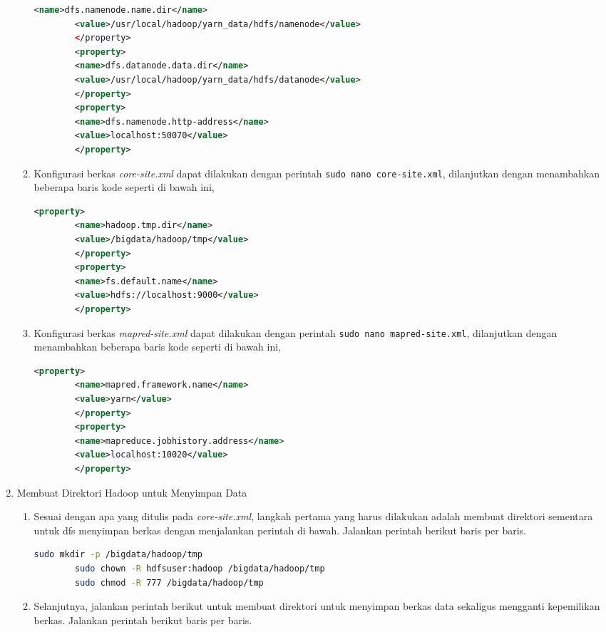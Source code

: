 \begin{enumerate}
\begin{enumerate}
\begin{lstlisting}[language=XML]
		<name>dfs.namenode.name.dir</name>
		<value>/usr/local/hadoop/yarn_data/hdfs/namenode</value>
		</property>
		<property>
		<name>dfs.datanode.data.dir</name>
		<value>/usr/local/hadoop/yarn_data/hdfs/datanode</value>
		</property>
		<property>
		<name>dfs.namenode.http-address</name>
		<value>localhost:50070</value>
		</property>
      \end{lstlisting}
    \item Konfigurasi berkas \textit{core-site.xml} dapat dilakukan dengan perintah \verb|sudo nano core-site.xml|, dilanjutkan dengan menambahkan beberapa baris kode seperti di bawah ini,
       \begin{lstlisting}[language=XML]
		<property>
		<name>hadoop.tmp.dir</name>
		<value>/bigdata/hadoop/tmp</value>
		</property>
		<property>
		<name>fs.default.name</name>
		<value>hdfs://localhost:9000</value>
		</property>
      \end{lstlisting}
    \item Konfigurasi berkas \textit{mapred-site.xml} dapat dilakukan dengan perintah \verb|sudo nano mapred-site.xml|, dilanjutkan dengan menambahkan beberapa baris kode seperti di bawah ini,
       \begin{lstlisting}[language=XML]
		<property>
		<name>mapred.framework.name</name>
		<value>yarn</value>
		</property>
		<property>
		<name>mapreduce.jobhistory.address</name>
		<value>localhost:10020</value>
		</property>
      \end{lstlisting}
  \end{enumerate}
  \item Membuat Direktori Hadoop untuk Menyimpan Data
  \begin{enumerate}
    \item Sesuai dengan apa yang ditulis pada \textit{core-site.xml}, langkah pertama yang harus dilakukan adalah membuat direktori sementara untuk dfs menyimpan berkas dengan menjalankan perintah di bawah. Jalankan perintah berikut baris per baris.
       \begin{lstlisting}[language=bash]
		sudo mkdir -p /bigdata/hadoop/tmp
		sudo chown -R hdfsuser:hadoop /bigdata/hadoop/tmp
		sudo chmod -R 777 /bigdata/hadoop/tmp
      \end{lstlisting}
    \item Selanjutnya, jalankan perintah berikut untuk membuat direktori untuk menyimpan berkas data sekaligus mengganti kepemilikan berkas. Jalankan perintah berikut baris per baris.
       \begin{lstlisting}[language=bash]

\end{lstlisting}
\end{enumerate}
\end{enumerate}
